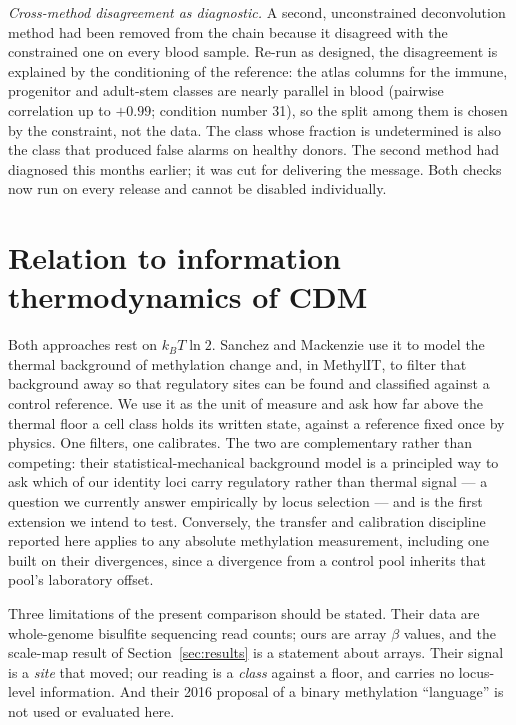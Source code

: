 \documentclass[12pt,a4paper]{article}
\begin{document}
\emph{Cross-method disagreement as diagnostic.} A second, unconstrained deconvolution method had been removed from the chain because it disagreed with the constrained one on every blood sample. Re-run as designed, the disagreement is explained by the conditioning of the reference: the atlas columns for the immune, progenitor and adult-stem classes are nearly parallel in blood (pairwise correlation up to $+0.99$; condition number 31), so the split among them is chosen by the constraint, not the data. The class whose fraction is undetermined is also the class that produced false alarms on healthy donors. The second method had diagnosed this months earlier; it was cut for delivering the message. Both checks now run on every release and cannot be disabled individually.

\section{Relation to information thermodynamics of CDM}
\label{sec:relation}

Both approaches rest on $k_B T\ln 2$. Sanchez and Mackenzie use it to model the thermal background of methylation change and, in MethylIT, to filter that background away so that regulatory sites can be found and classified against a control reference. We use it as the unit of measure and ask how far above the thermal floor a cell class holds its written state, against a reference fixed once by physics. One filters, one calibrates. The two are complementary rather than competing: their statistical-mechanical background model is a principled way to ask which of our identity loci carry regulatory rather than thermal signal --- a question we currently answer empirically by locus selection --- and is the first extension we intend to test. Conversely, the transfer and calibration discipline reported here applies to any absolute methylation measurement, including one built on their divergences, since a divergence from a control pool inherits that pool's laboratory offset.

Three limitations of the present comparison should be stated. Their data are whole-genome bisulfite sequencing read counts; ours are array $\beta$ values, and the scale-map result of Section~\ref{sec:results} is a statement about arrays. Their signal is a \emph{site} that moved; our reading is a \emph{class} against a floor, and carries no locus-level information. And their 2016 proposal of a binary methylation ``language'' is not used or evaluated here.
\end{document}
